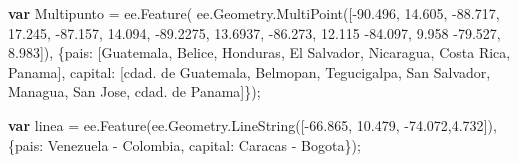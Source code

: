 \documentclass[
  12pt,
  letterpaper,
  twoside]{book}
\newenvironment{Shaded}{\begin{snugshade}}{\end{snugshade}}
\newcommand{\AttributeTok}[1]{\textcolor[rgb]{0.48,0.12,0.64}{#1}}
\newcommand{\DataTypeTok}[1]{\textcolor[rgb]{0.00,0.00,0.00}{#1}}
\newcommand{\FloatTok}[1]{\textcolor[rgb]{0.28,0.53,0.93}{#1}}
\newcommand{\FunctionTok}[1]{\textcolor[rgb]{0.48,0.12,0.64}{#1}}
\newcommand{\KeywordTok}[1]{\textcolor[rgb]{0.00,0.00,0.00}{\textbf{#1}}}
\newcommand{\NormalTok}[1]{#1}
\newcommand{\OperatorTok}[1]{\textcolor[rgb]{0.00,0.00,0.00}{#1}}
\newcommand{\StringTok}[1]{\textcolor[rgb]{0.87,0.29,0.22}{#1}}
\begin{document}
\begin{Shaded}
\begin{Highlighting}[]
\KeywordTok{var}\NormalTok{ Multipunto }\OperatorTok{=}\NormalTok{ ee}\OperatorTok{.}\FunctionTok{Feature}\NormalTok{(}
\NormalTok{ee}\OperatorTok{.}\AttributeTok{Geometry}\OperatorTok{.}\FunctionTok{MultiPoint}\NormalTok{([}\OperatorTok{{-}}\FloatTok{90.496}\OperatorTok{,} \FloatTok{14.605}\OperatorTok{,}                               
                        \OperatorTok{{-}}\FloatTok{88.717}\OperatorTok{,} \FloatTok{17.245}\OperatorTok{,}                              
                        \OperatorTok{{-}}\FloatTok{87.157}\OperatorTok{,} \FloatTok{14.094}\OperatorTok{,}
                        \OperatorTok{{-}}\FloatTok{89.2275}\OperatorTok{,} \FloatTok{13.6937}\OperatorTok{,}
                        \OperatorTok{{-}}\FloatTok{86.273}\OperatorTok{,} \FloatTok{12.115}
                        \OperatorTok{{-}}\FloatTok{84.097}\OperatorTok{,} \FloatTok{9.958}
                        \OperatorTok{{-}}\FloatTok{79.527}\OperatorTok{,} \FloatTok{8.983}\NormalTok{])}\OperatorTok{,}
\NormalTok{    \{}\DataTypeTok{pais}\OperatorTok{:}\NormalTok{ [}\StringTok{\textquotesingle{}Guatemala\textquotesingle{}}\OperatorTok{,} 
        \StringTok{\textquotesingle{}Belice\textquotesingle{}}\OperatorTok{,} 
        \StringTok{\textquotesingle{}Honduras\textquotesingle{}}\OperatorTok{,} 
        \StringTok{\textquotesingle{}El Salvador\textquotesingle{}}\OperatorTok{,} 
        \StringTok{\textquotesingle{}Nicaragua\textquotesingle{}}\OperatorTok{,} 
        \StringTok{\textquotesingle{}Costa Rica\textquotesingle{}}\OperatorTok{,} 
        \StringTok{\textquotesingle{}Panama\textquotesingle{}}\NormalTok{]}\OperatorTok{,}
    \DataTypeTok{capital}\OperatorTok{:}\NormalTok{    [}\StringTok{\textquotesingle{}cdad. de Guatemala\textquotesingle{}}\OperatorTok{,} 
        \StringTok{\textquotesingle{}Belmopan\textquotesingle{}}\OperatorTok{,} 
        \StringTok{\textquotesingle{}Tegucigalpa\textquotesingle{}}\OperatorTok{,} 
        \StringTok{\textquotesingle{}San Salvador\textquotesingle{}}\OperatorTok{,} 
        \StringTok{\textquotesingle{}Managua\textquotesingle{}}\OperatorTok{,} 
        \StringTok{\textquotesingle{}San Jose\textquotesingle{}}\OperatorTok{,} 
        \StringTok{\textquotesingle{}cdad. de Panama\textquotesingle{}}\NormalTok{]\})}\OperatorTok{;}

\KeywordTok{var}\NormalTok{ linea }\OperatorTok{=}\NormalTok{ ee}\OperatorTok{.}\FunctionTok{Feature}\NormalTok{(ee}\OperatorTok{.}\AttributeTok{Geometry}\OperatorTok{.}\FunctionTok{LineString}\NormalTok{([}\OperatorTok{{-}}\FloatTok{66.865}\OperatorTok{,} \FloatTok{10.479}\OperatorTok{,}                    
                            \OperatorTok{{-}}\FloatTok{74.072}\OperatorTok{,}\FloatTok{4.732}\NormalTok{])}\OperatorTok{,}
\NormalTok{        \{}\DataTypeTok{pais}\OperatorTok{:} \StringTok{\textquotesingle{}Venezuela {-} Colombia\textquotesingle{}}\OperatorTok{,} 
      \DataTypeTok{capital}\OperatorTok{:} \StringTok{\textquotesingle{}Caracas {-} Bogota\textquotesingle{}}\NormalTok{\})}\OperatorTok{;} 


\end{Highlighting}
\end{Shaded}
\end{document}
